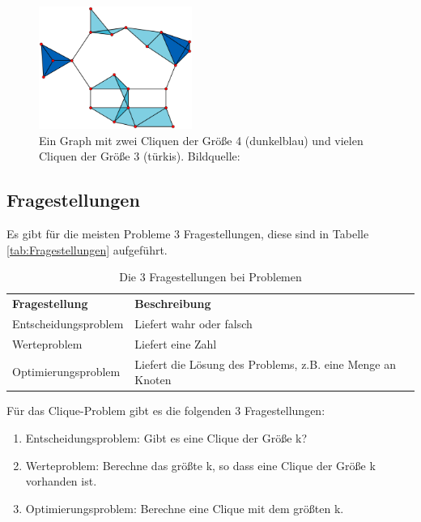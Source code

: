 \documentclass[ngerman]{article}
\begin{document}
\begin{figure}[H]
	\centering
	\includegraphics[width=5cm]{figures/clique2.png}
	\caption[Ein Graph mit zwei Cliquen der Größe 4]{Ein Graph mit zwei Cliquen der Größe 4 (dunkelblau) und vielen Cliquen der Größe 3 (türkis). Bildquelle: \cite{cliqueImage2}}
	\label{fig:Clique4}
\end{figure}

\subsection{Fragestellungen}
Es gibt für die meisten Probleme 3 Fragestellungen, diese sind in Tabelle \vref{tab:Fragestellungen} aufgeführt.
\begin{table}[H]
	\centering
	\begin{tabular}{ | p{} | p{} | }
		\hline \rowcolor{gray!15}
		\textbf{Fragestellung} & \textbf{Beschreibung} \\ \hhline{|=|=|}
		Entscheidungsproblem & Liefert wahr oder falsch \\ \hline
		Werteproblem & Liefert eine Zahl \\ \hline
		Optimierungsproblem & Liefert die Lösung des Problems, z.B. eine Menge an Knoten \\ \hline	
	\end{tabular}
	\caption{Die 3 Fragestellungen bei Problemen}
	\label{tab:Fragestellungen}
\end{table}
Für das Clique-Problem gibt es die folgenden 3 Fragestellungen:
\begin{enumerate}
\item Entscheidungsproblem: Gibt es eine Clique der Größe k?\\
\item Werteproblem: Berechne das größte k, so dass eine Clique der Größe k vorhanden ist.\\
\item Optimierungsproblem: Berechne eine Clique mit dem größten k.\\
\end{enumerate}
\end{document}
